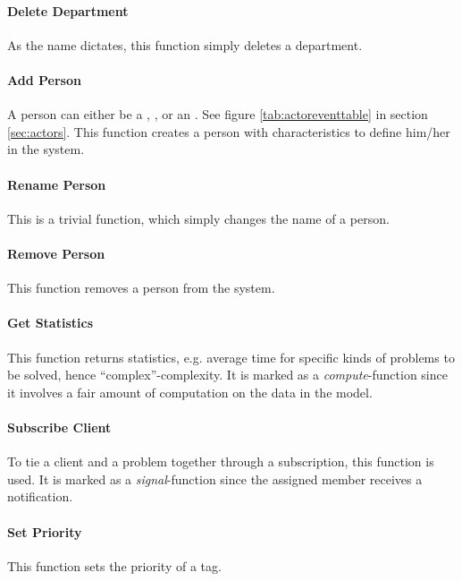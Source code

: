 \paragraph{Delete Department} As the name dictates, this function simply deletes a department. 

\paragraph{Add Person} A person can either be a \aclient[], \astaff[], or an \admin[]. See figure \ref{tab:actoreventtable} in section \ref{sec:actors}. This function creates a person with characteristics to define him/her in the system.

\paragraph{Rename Person} This is a trivial function, which simply changes the name of a person.

\paragraph{Remove Person} This function removes a person from the system.


\paragraph{Get Statistics} This function returns statistics, e.g. average time for specific kinds of problems to be solved, hence ``complex''-complexity. It is marked as a \textit{compute}-function since it involves a fair amount of computation on the data in the model.

\paragraph{Subscribe Client} To tie a client and a problem together through a subscription, this function is used. It is marked as a \textit{signal}-function since the assigned \astaff[] member receives a notification. 

\paragraph{Set Priority} This function sets the priority of a tag. 

